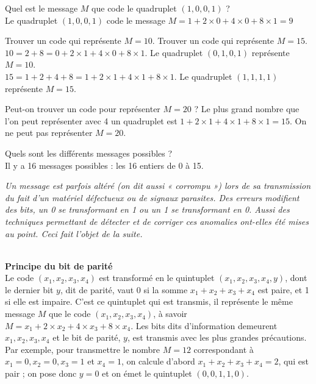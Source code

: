 \documentclass[a4paper,10pt,exos]{nsi}
\begin{document}
    \question \begin{enumalph}
        \item  \textcolor{UGLiBlue}{Quel est le message $M$ que code le quadruplet $(1,0,0,1)$ ?}\\
        Le quadruplet $(1,0,0,1)$ code le message $M=1+2\times 0+4\times 0+8\times 1=9$
        \item \textcolor{UGLiBlue}{Trouver un code qui représente $M = 10$. Trouver un code qui représente $M = 15$}.\\
        $10=2+8=0+2\times 1+4\times 0+8\times 1$. Le quadruplet $(0,1,0,1)$ représente $M=10$.\\
        $15=1+2+4+8=1+2\times 1+4\times 1+8\times 1$. Le quadruplet $(1,1,1,1)$ représente $M=15$.
        \item \textcolor{UGLiBlue}{Peut-on trouver un code pour représenter $M = 20$ ?}
        Le plus grand nombre que l'on peut représenter avec 4 un quadruplet est $1+2\times 1+4\times 1+8\times 1=15$. On ne peut pas représenter $M=20$.
        \item \textcolor{UGLiBlue}{Quels sont les différents messages possibles ?}\\
        Il y a 16 messages possibles : les 16 entiers de 0 à 15.
    \end{enumalph}

    \textcolor{UGLiBlue}{\small{\textit{Un message est parfois altéré (on dit aussi « corrompu ») lors de sa transmission du fait d’un matériel défectueux ou de signaux parasites. Des erreurs modifient des bits, un 0 se transformant en 1 ou un 1 se transformant en 0. Aussi des techniques permettant de détecter et de corriger ces anomalies ont-elles été mises au point. Ceci fait l’objet de la suite.}}}\\

    \normalsize

    {\titlefont\color{UGLiBlue}{Codage d'un message avec protection contre les erreurs}}\\
    \question \textbf{\textcolor{UGLiBlue}{Principe du bit de parité}}\\
    \textcolor{UGLiBlue}{Le code $(x_1,x_2,x_3,x_4)$ est transformé en le quintuplet $(x_1,x_2,x_3,x_4,y)$, dont le dernier bit $y$, dit de parité, vaut 0 si la somme $x_1+x_2+x_3+x_4$ est paire, et 1 si elle est impaire. C’est ce quintuplet qui est transmis, il représente le même message $M$ que le code $(x_1,x_2,x_3,x_4)$, à savoir $M=x_1+2\times x_2+4\times x_3+8\times x_4$. Les bits dits d’information demeurent $x_1,x_2,x_3,x_4$ et le bit de parité, $y$, est transmis avec les plus grandes précautions.\\[.5em]
    Par exemple, pour transmettre le nombre $M = 12$ correspondant à $x_1 = 0, x_2 = 0, x_3 = 1$ et $x_4 = 1$, on calcule d’abord $x_1 + x_2 + x_3 + x_4 = 2$, qui est pair ; on pose donc $y = 0$ et on émet le quintuplet $(0,0,1,1,0)$.}\\ 
\end{document}
